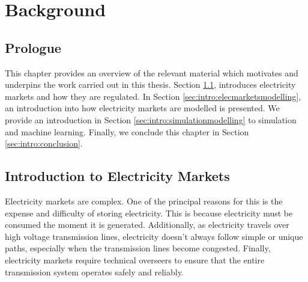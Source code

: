 
\chapter{Background}
\label{chapter:background}
\ifpdf
\graphicspath{{Chapter2/Figs/Raster/}{Chapter2/Figs/PDF/}{Chapter2/Figs/}}
\else
\graphicspath{{Chapter2/Figs/Vector/}{Chapter2/Figs/}}
\fi


\section*{Prologue}

This chapter provides an overview of the relevant material which motivates and underpins the work carried out in this thesis. Section \ref{sec:intro:elecmarkets}, introduces electricity markets and how they are regulated. In Section \ref{sec:intro:elecmarketsmodelling}, an introduction into how electricity markets are modelled is presented. We provide an introduction in Section \ref{sec:intro:simulationmodelling} to simulation and machine learning. Finally, we conclude this chapter in Section \ref{sec:intro:conclusion}.


%

\section{Introduction to Electricity Markets}
\label{sec:intro:elecmarkets}

Electricity markets are complex. One of the principal reasons for this is the expense and difficulty of storing electricity. This is because electricity must be consumed the moment it is generated. Additionally, as electricity travels over high voltage transmission lines, electricity doesn't always follow simple or unique paths, especially when the transmission lines become congested. Finally, electricity markets require technical overseers to ensure that the entire transmission system operates safely and reliably. 

